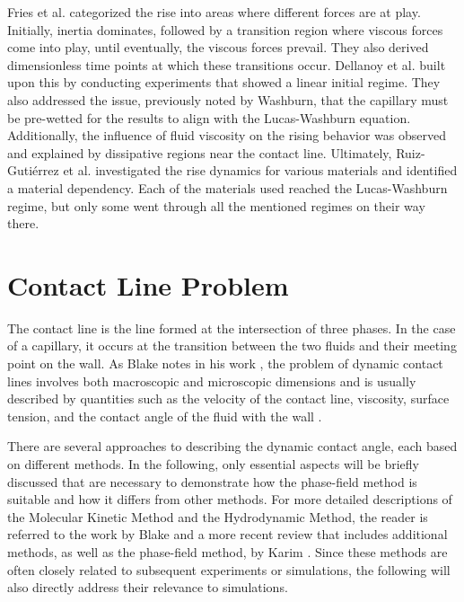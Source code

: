 Fries et al. \cite{fries2008TransitionInertialViscous} categorized the rise into areas where different forces are at play. Initially, inertia dominates, followed by a transition region where viscous forces come into play, until eventually, the viscous forces prevail. They also derived dimensionless time points at which these transitions occur.
Dellanoy et al. \cite{delannoy2019DualRoleViscosity} built upon this by conducting experiments that showed a linear initial regime. They also addressed the issue, previously noted by Washburn\cite{washburn1921DynamicsCapillaryFlow}, that the capillary must be pre-wetted for the results to align with the Lucas-Washburn equation. Additionally, the influence of fluid viscosity on the rising behavior was observed and explained by dissipative regions near the contact line.
Ultimately, Ruiz-Gutiérrez et al. \cite{ruiz-gutierrez2022LongCrossoverDynamics} investigated the rise dynamics for various materials and identified a material dependency. Each of the materials used reached the Lucas-Washburn regime, but only some went through all the mentioned regimes on their way there. 



\section{Contact Line Problem}
\label{sec: ContactLineProblem}

The contact line is the line formed at the intersection of three phases. In the case of a capillary, it occurs at the transition between the two fluids and their meeting point on the wall. As Blake notes in his work \cite{blake2006PhysicsMovingWetting}, the problem of dynamic contact lines involves both macroscopic and microscopic dimensions and is usually described by quantities such as the velocity of the contact line, viscosity, surface tension, and the contact angle of the fluid with the wall \cite{blake2006PhysicsMovingWetting, voinovHydrodynamicsWetting1977, cox1986DynamicsSpreadingLiquids}.


There are several approaches to describing the dynamic contact angle, each based on different methods. In the following, only essential aspects will be briefly discussed that are necessary to demonstrate how the phase-field method is suitable and how it differs from other methods. For more detailed descriptions of the Molecular Kinetic Method and the Hydrodynamic Method, the reader is referred to the work by Blake \cite{blake2006PhysicsMovingWetting} and a more recent review that includes additional methods, as well as the phase-field method, by Karim \cite{mohammadkarim2022ReviewPhysicsMoving}. Since these methods are often closely related to subsequent experiments or simulations, the following will also directly address their relevance to simulations.


